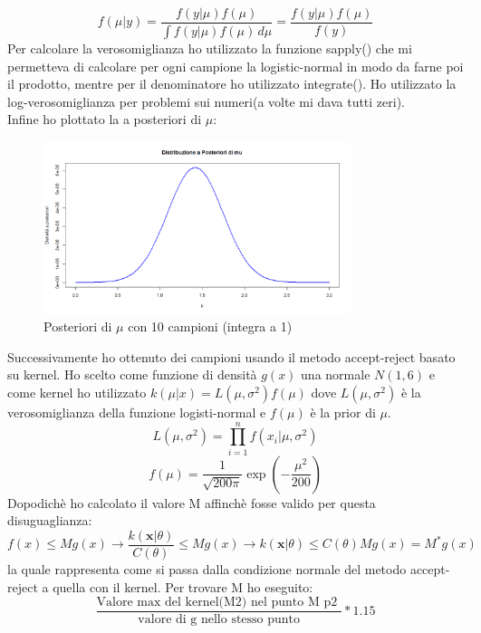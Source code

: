 \documentclass[a4paper,12pt]{article}
\begin{document}
\begin{itemize}
	\[
	f(\mu | y) = \frac{f(y | \mu) f(\mu)}{\int f(y | \mu) f(\mu) \, d\mu} = \frac{f(y | \mu) f(\mu)}{f(y)}
	\]
	Per calcolare la verosomiglianza ho utilizzato la funzione sapply() che mi permetteva di calcolare per ogni campione la logistic-normal in modo da farne poi il prodotto, mentre per il denominatore ho utilizzato integrate(). Ho utilizzato la log-verosomiglianza per problemi sui numeri(a volte mi dava tutti zeri).\\
	Infine ho plottato la a posteriori di $\mu$:
	\begin{figure}[h] %
		\centering %
		\includegraphics[width=0.8\textwidth]{post.png} %
		\caption{Posteriori di $\mu$ con 10 campioni (integra a 1)} %
		\label{fig:immagine} %
	\end{figure}
	\newpage
	Successivamente ho ottenuto dei campioni usando il metodo accept-reject basato su kernel. Ho scelto come funzione di densità $g(x)$ una normale $N(1,6)$ e come kernel ho utilizzato $k(\mu | x)=L(\mu,\sigma^2) f(\mu)$
	dove $L(\mu,\sigma^2)$ è la verosomiglianza della funzione logisti-normal e $f(\mu)$ è la prior di $\mu$.
	\[
	L(\mu, \sigma^2) = \prod_{i=1}^n f(x_i | \mu, \sigma^2)
	\]
	\[
	f(\mu) = \frac{1}{\sqrt{200 \pi}} \exp \left( -\frac{\mu^2}{200} \right)
	\]
	Dopodichè ho calcolato il valore M affinchè fosse valido per questa disuguaglianza:\\
	\[
	f(x) \leq M g(x) \rightarrow \frac{k(\mathbf{x}|\theta)}{C(\theta)} \leq M g(x) \rightarrow k(\mathbf{x}|\theta) \leq C(\theta) M g(x) = M^* g(x)
	\]
	la quale rappresenta come si passa dalla condizione normale del metodo accept-reject a quella con il kernel. Per trovare M ho eseguito:\\
	\[
	\frac{\text{Valore max del kernel(M2) nel punto M p2 }}{\text{valore di g nello stesso punto}} * 1.15	
\]
\end{itemize}
\end{document}
